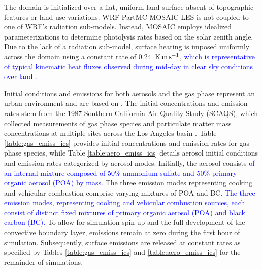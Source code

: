 \documentclass[journal abbreviation, manuscript]{copernicus}
\begin{document}
The domain is initialized over a flat, uniform land surface absent of
topographic features or land-use variations. WRF-PartMC-MOSAIC-LES is
not coupled to one of WRF's radiation sub-models. Instead, MOSAIC
employs idealized parameterizations to determine photolysis rates
based on the solar zenith angle. Due to the lack of a radiation
sub-model, surface heating is imposed uniformly across the domain
using a constant rate of 0.24~$\rm K \, m \,
s^{-1}$, \textcolor{blue}{which is representative of typical kinematic heat fluxes
observed during mid-day in clear sky conditions over land \citep{stull_introduction_1988}.} %

Initial conditions and emissions for both aerosols and the gas phase
represent an urban environment and are based on
\citet{riemer_simulating_2009}. The initial concentrations and
emission rates stem from the 1987 Southern California Air Quality
Study (SCAQS), which collected measurements of gas phase species and
particulate matter mass concentrations at multiple sites across the
Los Angeles basin \citep{zaveri_model_2008}. Table
\ref{table:gas_emiss_ics} provides initial concentrations and emission
rates for gas phase species, while Table \ref{table:aero_emiss_ics}
details aerosol initial conditions and emission rates categorized by
aerosol modes. Initially, the aerosol consists \textcolor{blue}{of an internal mixture composed of 50\% ammonium sulfate and 50\% primary organic aerosol (POA) by mass.}
The three emission modes representing cooking and vehicular combustion
comprise varying mixtures of POA and BC. \textcolor{blue}{The
  three emission modes, representing cooking and vehicular combustion
  sources, each consist of distinct fixed mixtures of primary organic
  aerosol (POA) and black carbon (BC).} To allow for simulation spin-up and the
full development of the convective boundary layer, emissions remain at
zero during the first hour of simulation. Subsequently, surface
emissions are released at constant rates as specified by Tables
\ref{table:gas_emiss_ics} and \ref{table:aero_emiss_ics} for the
remainder of simulations.
\end{document}
